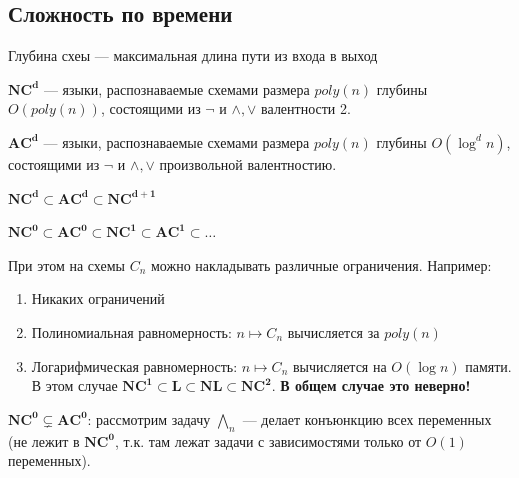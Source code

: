 \subsection{Сложность по времени}

\begin{definition}
    Глубина схеы --- максимальная длина пути из входа в выход
\end{definition}

\begin{definition}
    \(\mathbf{NC^d}\) --- языки, распознаваемые схемами размера \(poly(n)\) глубины \(O(poly(n))\), состоящими из \(\neg\) и \(\wedge, \vee\) валентности 2.
\end{definition}

\begin{definition}
    \(\mathbf{AC^d}\) --- языки, распознаваемые схемами размера \(poly(n)\) глубины \(O(\log^dn)\), состоящими из \(\neg\) и \(\wedge, \vee\) произвольной валентностию.
\end{definition}

\begin{note}
    \(\mathbf{NC^d} \subset \mathbf{AC^d} \subset \mathbf{NC^{d + 1}}\)
\end{note}

\begin{corollary}
    \(\mathbf{NC^0} \subset \mathbf{AC^0} \subset \mathbf{NC^1} \subset \mathbf{AC^1} \subset \dots\)
\end{corollary}

При этом на схемы \(C_n\) можно накладывать различные ограничения. Например:
\begin{enumerate}
    \item Никаких ограничений
    \item Полиномиальная равномерность: \(n \mapsto C_n\) вычисляется за \(poly(n)\)
    \item Логарифмическая равномерность: \(n \mapsto C_n\) вычисляется на \(O(\log n)\) памяти. В этом случае \(\mathbf{NC^1} \subset \mathbf{L} \subset \mathbf{NL} \subset \mathbf{NC^2}\). \textbf{В общем случае это неверно!}
\end{enumerate}

\begin{note}
    \(\mathbf{NC^0} \subsetneq \mathbf{AC^0}\): рассмотрим задачу \(\bigwedge_n\) --- делает конъюнкцию всех переменных (не лежит в \(\mathbf{NC^0}\), т.к. там лежат задачи с зависимостями только от \(O(1)\) переменных).
\end{note}

